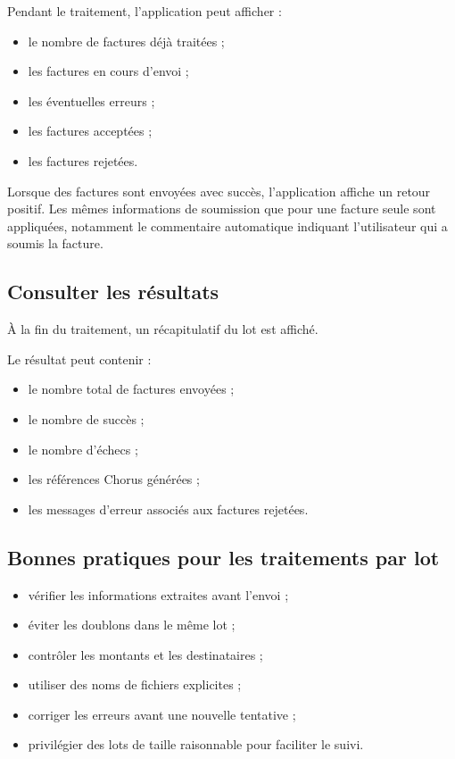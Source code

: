\documentclass[11pt,a4paper]{article}
\begin{document}
Pendant le traitement, l'application peut afficher :

\begin{itemize}
  \item le nombre de factures déjà traitées ;
  \item les factures en cours d'envoi ;
  \item les éventuelles erreurs ;
  \item les factures acceptées ;
  \item les factures rejetées.
\end{itemize}

Lorsque des factures sont envoyées avec succès, l'application affiche un retour
positif. Les mêmes informations de soumission que pour une facture seule sont
appliquées, notamment le commentaire automatique indiquant l'utilisateur qui a
soumis la facture.

\subsection{Consulter les résultats}

À la fin du traitement, un récapitulatif du lot est affiché.

Le résultat peut contenir :

\begin{itemize}
  \item le nombre total de factures envoyées ;
  \item le nombre de succès ;
  \item le nombre d'échecs ;
  \item les références Chorus générées ;
  \item les messages d'erreur associés aux factures rejetées.
\end{itemize}

\subsection{Bonnes pratiques pour les traitements par lot}

\begin{itemize}
  \item vérifier les informations extraites avant l'envoi ;
  \item éviter les doublons dans le même lot ;
  \item contrôler les montants et les destinataires ;
  \item utiliser des noms de fichiers explicites ;
  \item corriger les erreurs avant une nouvelle tentative ;
  \item privilégier des lots de taille raisonnable pour faciliter le suivi.
\end{itemize}
\end{document}
